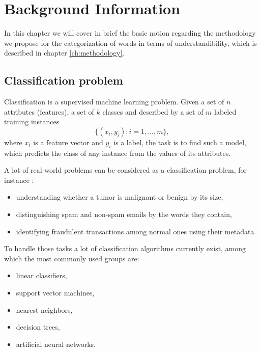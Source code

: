 \chapter{Background Information}
\label{ch:background-information}


In this chapter we will cover in brief the basic notion regarding the methodology we propose for the categorization of words in terms of understandibility, which is described in chapter \ref{ch:methodology}.

\section{Classification problem}
Classification is a supervised machine learning problem. Given a set
of $n$ attributes (features), a set of $k$ classes and described by a set of $m$ labeled training instances $$\{(x_i,y_i); i=1,...,m\},$$ where $x_i$
is a feature vector and $y_i$  is a label, the task is to find such a
model, which predicts the class of any instance from the values of its attributes.

A lot of real-world problems can be considered as a classification problem, for instance \citep{Ng-2012cs229}:
\begin{itemize}
    \item understanding whether a tumor is malignant or benign by its size,
    \item distinguishing spam and non-spam emails by the words they contain,
    \item identifying fraudulent transactions among normal ones using their metadata.
\end{itemize}
To handle those tasks a lot of classification algorithms currently exist, among which the most commonly used groups are: 
\begin{itemize}
 \item linear classifiers,
 \item support vector machines,
 \item nearest neighbors,
 \item decision trees,
 \item artificial neural networks.
\end{itemize} 

